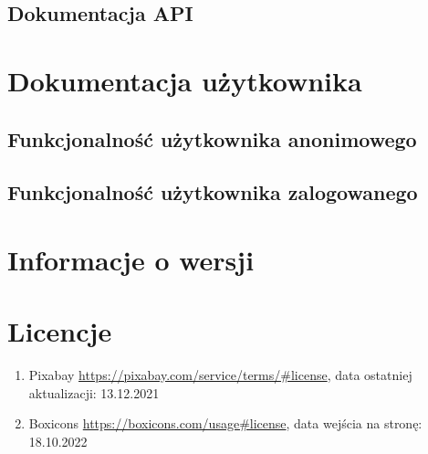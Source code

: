\documentclass[12pt]{article}
\begin{document}
		\subsection{Dokumentacja API}	%
			
	\section{Dokumentacja użytkownika}
		\subsection{Funkcjonalność użytkownika anonimowego}
%		
		\subsection{Funkcjonalność użytkownika zalogowanego}
%		
%	
	\section{Informacje o wersji}
	
	


	
	
			
	\pagebreak
	\section{Licencje}
		\begin{enumerate}
			\item	Pixabay
			\url{https://pixabay.com/service/terms/#license}, 
			data ostatniej aktualizacji: 13.12.2021
			
			
			\item	Boxicons
			\url{https://boxicons.com/usage#license}, 
			data wejścia na stronę: 18.10.2022
		\end{enumerate}
	
\end{document}
